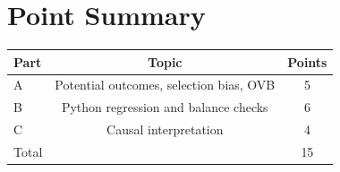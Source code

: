 \documentclass[11pt]{article}
\begin{document}
\section*{Point Summary}
\begin{center}
\begin{tabular}{lcc}
\toprule
Part & Topic & Points \\
\midrule
A & Potential outcomes, selection bias, OVB & 5 \\
B & Python regression and balance checks & 6 \\
C & Causal interpretation & 4 \\
\midrule
Total & & 15 \\
\bottomrule
\end{tabular}
\end{center}
\end{document}
